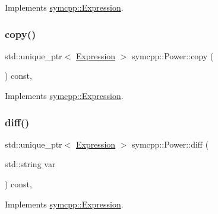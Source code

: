 Implements \mbox{\hyperlink{classsymcpp_1_1Expression_a81c8069347f586cb5632338d97c278ad}{symcpp\+::\+Expression}}.

\mbox{\label{classsymcpp_1_1Power_ac628b9070382bde67b838f291f81ddc4}} 
\subsubsection{\texorpdfstring{copy()}{copy()}}
{\footnotesize\ttfamily std\+::unique\+\_\+ptr$<$ \mbox{\hyperlink{classsymcpp_1_1Expression}{Expression}} $>$ symcpp\+::\+Power\+::copy (\begin{DoxyParamCaption}{ }\end{DoxyParamCaption}) const\hspace{0.3cm}{\ttfamily [override]}, {\ttfamily [virtual]}}



Implements \mbox{\hyperlink{classsymcpp_1_1Expression_a2e7de5a295ccf0efdc9b34cea7ba3d0b}{symcpp\+::\+Expression}}.

\mbox{\label{classsymcpp_1_1Power_ac8fdf5b0ddfa04647ba93a6c383d4a7b}} 
\subsubsection{\texorpdfstring{diff()}{diff()}}
{\footnotesize\ttfamily std\+::unique\+\_\+ptr$<$ \mbox{\hyperlink{classsymcpp_1_1Expression}{Expression}} $>$ symcpp\+::\+Power\+::diff (\begin{DoxyParamCaption}\item[{std\+::string}]{var }\end{DoxyParamCaption}) const\hspace{0.3cm}{\ttfamily [override]}, {\ttfamily [virtual]}}



Implements \mbox{\hyperlink{classsymcpp_1_1Expression_a032fe8da79d5e231ca2d21a201c8f32d}{symcpp\+::\+Expression}}.

\mbox{\label{classsymcpp_1_1Power_af90cd850099fda788416ab5aa9e752e2}} 
